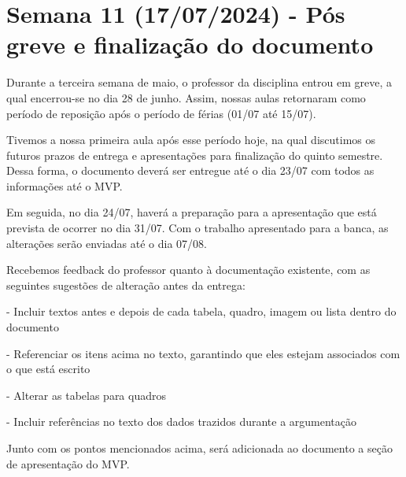 \section{Semana 11 (17/07/2024) - Pós greve e finalização do documento}
Durante a terceira semana de maio, o professor da disciplina entrou em greve, a qual encerrou-se no dia 28 de junho. Assim, nossas aulas retornaram como período de reposição após o período de férias (01/07 até 15/07). 

Tivemos a nossa primeira aula após esse período hoje, na qual discutimos os futuros prazos de entrega e apresentações para finalização do quinto semestre. Dessa forma, o documento deverá ser entregue até o dia 23/07 com todos as informações até o MVP.

Em seguida, no dia 24/07, haverá a preparação para a apresentação que está prevista de ocorrer no dia 31/07. Com o trabalho apresentado para a banca, as alterações serão enviadas até o dia 07/08.

Recebemos feedback do professor quanto à documentação existente, com as seguintes sugestões de alteração antes da entrega:

- Incluir textos antes e depois de cada tabela, quadro, imagem ou lista dentro do documento

- Referenciar os itens acima no texto, garantindo que eles estejam associados com o que está escrito

- Alterar as tabelas para quadros

- Incluir referências no texto dos dados trazidos durante a argumentação



Junto com os pontos mencionados acima, será adicionada ao documento a seção de apresentação do MVP.
